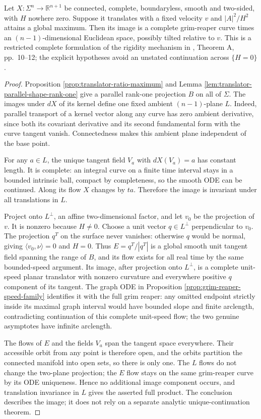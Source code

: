 \begin{theorem}\label{thm:translator-complete-ratio-rigidity}
Let $X:\Sigma^n\to\mathbb R^{n+1}$ be connected, complete, boundaryless, smooth and two-sided, with $H$ nowhere zero. Suppose it translates with a fixed velocity $v$ and $|A|^2/H^2$ attains a global maximum. Then its image is a complete grim-reaper curve times an $(n-1)$-dimensional Euclidean space, possibly tilted relative to $v$. This is a restricted complete formulation of the rigidity mechanism in \cite{MSHS14}, Theorem A, pp.~10--12; the explicit hypotheses avoid an unstated continuation across $\{H=0\}$.
\end{theorem}
\begin{proof}
Proposition \ref{prop:translator-ratio-maximum} and Lemma \ref{lem:translator-parallel-shape-rank-one} give a parallel rank-one projection $B$ on all of $\Sigma$. The images under $dX$ of its kernel define one fixed ambient $(n-1)$-plane $L$. Indeed, parallel transport of a kernel vector along any curve has zero ambient derivative, since both its covariant derivative and its second fundamental form with the curve tangent vanish. Connectedness makes this ambient plane independent of the base point.

For any $a\in L$, the unique tangent field $V_a$ with $dX(V_a)=a$ has constant length. It is complete: an integral curve on a finite time interval stays in a bounded intrinsic ball, compact by completeness, so the smooth ODE can be continued. Along its flow $X$ changes by $ta$. Therefore the image is invariant under all translations in $L$.

Project onto $L^\perp$, an affine two-dimensional factor, and let $v_0$ be the projection of $v$. It is nonzero because $H\ne0$. Choose a unit vector $q\in L^\perp$ perpendicular to $v_0$. The projection $q^T$ on the surface never vanishes: otherwise $q$ would be normal, giving $\langle v_0,\nu\rangle=0$ and $H=0$. Thus $E=q^T/|q^T|$ is a global smooth unit tangent field spanning the range of $B$, and its flow exists for all real time by the same bounded-speed argument. Its image, after projection onto $L^\perp$, is a complete unit-speed planar translator with nonzero curvature and everywhere positive $q$ component of its tangent. The graph ODE in Proposition \ref{prop:grim-reaper-speed-family} identifies it with the full grim reaper: any omitted endpoint strictly inside its maximal graph interval would have bounded slope and finite arclength, contradicting continuation of this complete unit-speed flow; the two genuine asymptotes have infinite arclength.

The flows of $E$ and the fields $V_a$ span the tangent space everywhere. Their accessible orbit from any point is therefore open, and the orbits partition the connected manifold into open sets, so there is only one. The $L$ flows do not change the two-plane projection; the $E$ flow stays on the same grim-reaper curve by its ODE uniqueness. Hence no additional image component occurs, and translation invariance in $L$ gives the asserted full product. The conclusion describes the image; it does not rely on a separate analytic unique-continuation theorem.
\end{proof}
